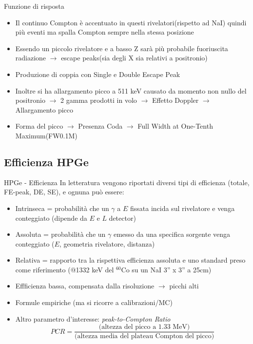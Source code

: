 \documentclass{beamer}
\begin{document}
\begin{frame}{Funzione di risposta}
    \begin{itemize}
        \item Il continuo Compton è accentuato in questi rivelatori(rispetto ad NaI) quindi più eventi ma spalla Compton sempre nella stessa posizione
        \item Essendo un piccolo rivelatore e a basso Z sarà più probabile fuoriuscita radiazione $\to$ escape peaks(sia degli X sia relativi a positronio)
        \item Produzione di coppia con Single e Double Escape Peak
        \item Inoltre si ha allargamento picco a 511 keV causato da momento non nullo del positronio $\to$ 2 gamma prodotti in volo $\to$ Effetto Doppler $\to$ Allargamento picco
        \item Forma del picco $\to$ Presenza Coda $\to$  Full Width at One-Tenth Maximum(FW0.1M)
    \end{itemize} 
\end{frame}

\subsection{Efficienza HPGe}
\begin{frame}{HPGe - Efficienza}
    In letteratura vengono riportati diversi tipi di efficienza (totale, FE-peak, DE, SE), e ognuna può essere:
    \begin{itemize}
        \item Intrinseca = probabilità che un $\gamma$ a $E$ fissata incida sul rivelatore e venga conteggiato (dipende da $E$ e $L$ detector)
        \item Assoluta = probabilità che un $\gamma$ emesso da una specifica sorgente venga conteggiato ($E$, geometria rivelatore, distanza)
        \item Relativa = rapporto tra la rispettiva efficienza assoluta e uno standard preso come riferimento (@1332 keV del $^{60}$Co su un NaI 3'' x 3'' a 25cm)
        \item Effficienza bassa, compensata dalla risoluzione $\to$ picchi alti
        \item Formule empiriche (ma si ricorre a calibrazioni/MC)
        \item Altro parametro d'interesse: \emph{peak-to-Compton Ratio}
    \begin{equation*}
        PCR =  \frac{\textrm{(altezza del picco a 1.33 MeV)}}{\textrm{(altezza media del plateau Compton del picco)}}
    \end{equation*}
     \end{itemize}
\end{frame}
\end{document}
